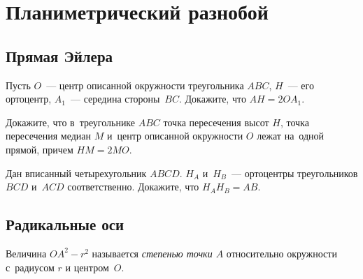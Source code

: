 
\section*{Планиметрический разнобой}




\providecommand{\ifradicalaxisexplained}{\iftrue}


\subsection*{Прямая Эйлера}

\begin{problems}

\item
Пусть $O$~--- центр описанной окружности треугольника $ABC$,
$H$~--- его ортоцентр,
$A_1$~--- середина стороны~$BC$.
Докажите, что $AH = 2 O A_1$.

\item
Докажите, что в~треугольнике $ABC$ точка пересечения высот $H$,
точка пересечения медиан $M$ и~центр описанной окружности $O$ лежат на~одной
прямой, причем $HM = 2 MO$.

\item
Дан вписанный четырехугольник $ABCD$.
$H_A$ и~$H_B$~--- ортоцентры треугольников $BCD$ и~$ACD$ соответственно.
Докажите, что $H_A H_B = AB$.

\end{problems}


\subsection*{Радикальные оси}

\ifradicalaxisexplained

Величина $OA^2 - r^2$ называется \emph{степенью точки $A$} относительно
окружности с~радиусом $r$ и центром~$O$.


